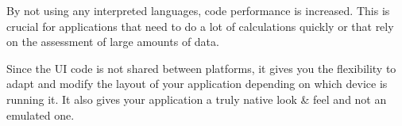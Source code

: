  By not using any interpreted languages, code performance is increased. This is crucial for applications that need to do a lot of calculations quickly or that rely on the assessment of large amounts of data.

 Since the UI code is not shared between platforms, it gives you the flexibility to adapt and modify the layout of your application depending on which device is running it. It also gives your application a truly native look \& feel and not an emulated one.     













  
